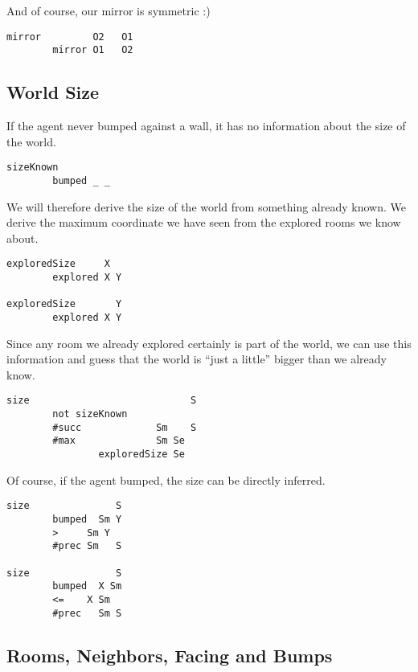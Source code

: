 And of course, our mirror is symmetric :)

\begin{verbatim}
mirror         O2   O1
        mirror O1   O2
\end{verbatim}

\hypertarget{world-size}{%
\subsection{World Size}\label{world-size}}

If the agent never bumped against a wall, it has no information about
the size of the world.

\begin{verbatim}
sizeKnown
        bumped _ _
\end{verbatim}

We will therefore derive the size of the world from something already
known. We derive the maximum coordinate we have seen from the explored
rooms we know about.

\begin{verbatim}
exploredSize     X
        explored X Y

exploredSize       Y
        explored X Y
\end{verbatim}

Since any room we already explored certainly is part of the world, we
can use this information and guess that the world is ``just a little''
bigger than we already know.

\begin{verbatim}
size                            S
        not sizeKnown
        #succ             Sm    S
        #max              Sm Se
                exploredSize Se
\end{verbatim}

Of course, if the agent bumped, the size can be directly inferred.

\begin{verbatim}
size               S
        bumped  Sm Y
        >     Sm Y
        #prec Sm   S

size               S
        bumped  X Sm
        <=    X Sm
        #prec   Sm S
\end{verbatim}

\hypertarget{rooms-neighbors-facing-and-bumps}{%
\subsection{Rooms, Neighbors, Facing and
Bumps}\label{rooms-neighbors-facing-and-bumps}}

